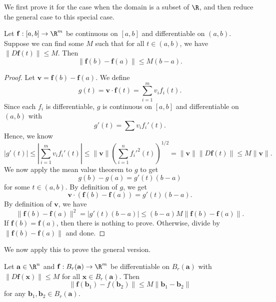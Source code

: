\documentclass[a4paper]{article}
\begin{document}
We first prove it for the case when the domain is a subset of $\R$, and then reduce the general case to this special case.
\begin{thm}
  Let $\mathbf{f}: [a, b] \to \R^m$ be continuous on $[a, b]$ and differentiable on $(a, b)$. Suppose we can find some $M$ such that for all $t \in (a, b)$, we have $\|D\mathbf{f}(t)\| \leq M$. Then
  \[
    \|\mathbf{f}(b) - \mathbf{f}(a)\| \leq M(b - a).
  \]
\end{thm}

\begin{proof}
  Let $\mathbf{v} = \mathbf{f}(b) - \mathbf{f}(a)$. We define
  \[
    g(t) = \mathbf{v}\cdot \mathbf{f}(t) = \sum_{i = 1}^m v_i f_i(t).
  \]
  Since each $f_i$ is differentiable, $g$ is continuous on $[a, b]$ and differentiable on $(a, b)$ with
  \[
    g'(t) = \sum v_i f_i' (t).
  \]
  Hence, we know
  \[
    |g'(t)| \leq \left|\sum_{i = 1}^m v_i f_i'(t)\right| \leq \|\mathbf{v}\| \left(\sum_{i = 1}^n f_i'^2(t)\right)^{1/2} = \|\mathbf{v}\| \|D\mathbf{f} (t)\| \leq M \|\mathbf{v}\|.
  \]
  We now apply the mean value theorem to $g$ to get
  \[
    g(b) - g(a) = g'(t)(b - a)
  \]
  for some $t \in (a, b)$. By definition of $g$, we get
  \[
    \mathbf{v} \cdot (\mathbf{f}(b) - \mathbf{f}(a)) = g'(t) (b - a).
  \]
  By definition of $\mathbf{v}$, we have
  \[
    \|\mathbf{f}(b) - \mathbf{f}(a)\|^2 = |g'(t)(b - a)| \leq (b - a) M \|\mathbf{f} (b) - \mathbf{f}(a)\|.
  \]
  If $\mathbf{f}(b) = \mathbf{f}(a)$, then there is nothing to prove. Otherwise, divide by $\|\mathbf{f}(b) - \mathbf{f}(a)\|$ and done.
\end{proof}

We now apply this to prove the general version.
\begin{thm}
  Let $\mathbf{a} \in \R^n$ and $\mathbf{f}: B_r(\mathbf{a}) \to \R^m$ be differentiable on $B_r(\mathbf{a})$ with $\|D\mathbf{f}(\mathbf{x})\| \leq M$ for all $\mathbf{x} \in B_r(\mathbf{a})$. Then
  \[
    \|\mathbf{f}(\mathbf{b}_1) - f(\mathbf{b}_2)\| \leq M\|\mathbf{b}_1 - \mathbf{b}_2\|
  \]
  for any $\mathbf{b}_1, \mathbf{b}_2 \in B_r(\mathbf{a})$.
\end{thm}
\end{document}
